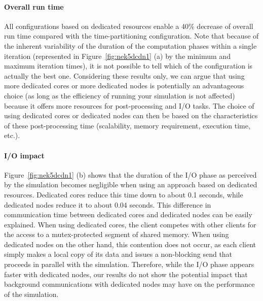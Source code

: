 \paragraph{Overall run time} All configurations based on dedicated resources enable a 40\% decrease of 
overall run time compared with the time-partitioning configuration. Note that because of the inherent 
variability of the duration of the computation phases within a single iteration (represented in 
Figure~\ref{fig:nek5dcdn1} (a) by the minimum and maximum iteration times), it is not possible to tell which of 
the configuration is actually the best one.
Considering these results only, we can argue that using more dedicated cores or more dedicated nodes is 
potentially an advantageous choice (as long as the efficiency of running your simulation is not affected) 
because it offers more resources for post-processing and I/O tasks.
The choice of using dedicated cores or dedicated nodes can then be based on the characteristics of these
post-processing time (scalability, memory requirement, execution time, etc.).

\paragraph{I/O impact}
Figure~\ref{fig:nek5dcdn1} (b) shows that the duration of the I/O phase as perceived by the simulation
becomes negligible when using an approach based on dedicated resources. Dedicated cores reduce this
time down to about 0.1 seconds, while dedicated nodes reduce it to about 0.04 seconds.
This difference in communication time between dedicated cores and dedicated nodes can be easily 
explained. When using dedicated cores, the client competes with other clients for the access to a 
mutex-protected segment of shared memory. When using dedicated
nodes on the other hand, this contention does not occur, as each client simply makes a local copy 
of its data and issues a non-blocking send that proceeds in parallel with the simulation. 
Therefore, while the I/O phase appears faster with dedicated nodes, our results do not show the potential
impact that background communications with dedicated nodes may have on the performance of the simulation.

